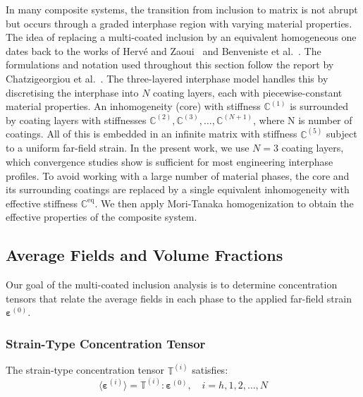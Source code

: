 \documentclass[oneside, 12pt, a4paper, bibliography=totoc]{book}
\newcommand{\bs}[1]{\bm{#1}}                       %
\begin{document}
In many composite systems, the transition from inclusion to matrix is not abrupt but occurs through a graded interphase region with varying material properties. The idea of replacing a multi-coated inclusion by an equivalent homogeneous one dates back to the works of Hervé and Zaoui~\cite{Herve1993, Herve1995} and Benveniste et al.~\cite{Benveniste1989}. The formulations and notation used throughout this section follow the report by Chatzigeorgiou et al.~\cite{ChatzigeorgiouMulticoated}. The three-layered interphase model handles this by discretising the interphase into $N$ coating layers, each with piecewise-constant material properties. An inhomogeneity (core) with stiffness $\mathbb{C}^{(1)}$ is surrounded by coating layers with stiffnesses $\mathbb{C}^{(2)}, \mathbb{C}^{(3)}, \ldots, \mathbb{C}^{(N+1)}$, where N is number of coatings. All of this is embedded in an infinite matrix with stiffness $\mathbb{C}^{(5)}$ subject to a uniform far-field strain. In the present work, we use $N=3$ coating layers, which convergence studies show is sufficient for most engineering interphase profiles. To avoid working with a large number of material phases, the core and its surrounding coatings are replaced by a single equivalent inhomogeneity with effective stiffness $\mathbb{C}^{\text{eq}}$. We then apply Mori-Tanaka homogenization to obtain the effective properties of the composite system.

\subsection{Average Fields and Volume Fractions}
\label{subsec:average_fields}

Our goal of the multi-coated inclusion analysis is to determine concentration tensors that relate the average fields in each phase to the applied far-field strain $\bs{\varepsilon}^{(0)}$.

\subsubsection{Strain-Type Concentration Tensor}
\label{subsec:strain_concentration}



The strain-type concentration tensor $\mathbb{T}^{(i)}$ satisfies:
%
\begin{equation}
    \langle \bs{\varepsilon}^{(i)} \rangle = \mathbb{T}^{(i)} : \bs{\varepsilon}^{(0)}, \quad i = h, 1, 2, \ldots, N
    \label{eq:strain_concentration}
\end{equation}
\end{document}
